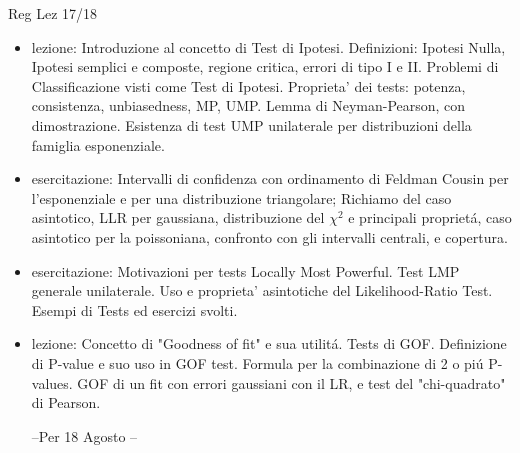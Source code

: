 \begin{frame}[allowframebreaks]{Reg Lez 17/18}
\begin{itemize}
\hypertarget{tests}{}

\item  lezione: Introduzione al concetto di Test di Ipotesi. Definizioni: Ipotesi Nulla, Ipotesi semplici e composte, regione critica, errori di tipo I e II. Problemi di Classificazione visti come Test di Ipotesi. Proprieta' dei tests: potenza, consistenza, unbiasedness, MP, UMP. Lemma di Neyman-Pearson, con dimostrazione. Esistenza di test UMP unilaterale per distribuzioni della famiglia esponenziale.

\item esercitazione: Intervalli di confidenza con ordinamento di Feldman Cousin per l'esponenziale e per una distribuzione triangolare; Richiamo del caso asintotico, LLR per gaussiana, distribuzione del $\chi^2$ e principali propriet\'a, caso asintotico per la poissoniana, confronto con gli intervalli centrali, e copertura.

\item esercitazione: Motivazioni per tests Locally Most Powerful. Test LMP generale unilaterale. Uso e proprieta' asintotiche del Likelihood-Ratio Test. Esempi di Tests ed esercizi svolti.


\item lezione: Concetto di "Goodness of fit" e sua utilit\'a. Tests di GOF. Definizione di P-value e suo uso in GOF test. Formula per la combinazione di 2 o pi\'u P-values. GOF di un fit con errori gaussiani con il LR, e test del "chi-quadrato" di Pearson.\hypertarget{goodnessoffit}{}

--Per 18 Agosto --
\end{itemize}


\end{frame}